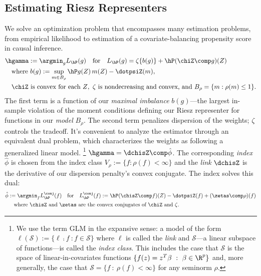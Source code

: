 \documentclass{article}
\newcommand{\calS}{\mathcal{S}}
\begin{document}
\subsection{Estimating Riesz Representers}
\label{sec:estimating-riesz}

We solve an optimization problem that encompasses many estimation problems, from empirical likelihood to estimation of a covariate-balancing propensity score in causal inference.
\begin{equation}
\label{eq:primal-moment-matching}
\begin{aligned}
&\hgamma := \argmin_{g} L_{\hP}(g) \qfor
L_{\hP}(g) =  \zeta\{b(g)\} + \hP (\chiZ \comp g)(Z) \\
&\quad \text{where} \ b(g) := \sup_{m \in B_\rho} \hP g(Z)\, m(Z) - \dotpsiZ(m), \\
&\quad \chiZ \ \text{is convex for each $Z$}, \ \zeta \ \text{is nondecreasing and convex, and} \ B_\rho = \{m : \rho(m) \le 1\}.
\end{aligned}
\end{equation}
The first term is a function of our \emph{maximal imbalance}
$b(g)$---the
largest in-sample violation of the moment conditions
defining our Riesz representer
for functions in our \emph{model} $B_\rho$.
The second term penalizes dispersion of the weights;
$\zeta$ controls the tradeoff.
It's convenient to analyze the estimator
through an equivalent dual problem,
which characterizes the weights
as following a generalized linear model.%
\footnote{We use the term GLM in the expansive sense:
a model of the form
$\ell(\calS) := \{ \ell \comp f \ : f \in \calS \}$
where $\ell$ is called the \emph{link}
and $\calS$---a linear subspace of functions---is
called the \emph{index class}.
This includes the case that $\calS$ is the space
of linear-in-covariates functions
$\{ f(z)=z^T \beta \ : \ \beta \in \R^p \}$
and, more generally, the case that
$\calS=\{ f \ : \ \rho(f) < \infty \}$
for any seminorm $\rho$.}
$\hgamma = \dchisZ \comp \hat\phi$.
The corresponding \emph{index} $\hat\phi$
is chosen from
the index class $V_\rho := \{f : \rho(f) < \infty\}$
and the \emph{link} $\dchisZ$
is the derivative
of our dispersion penalty's convex conjugate.
The index solves this dual:
\begin{equation}
\begin{aligned}
\label{eq:dual-problem}
\hat\phi &:= \argmin_{f} L^\conj_{\hP}(f) \qfor
L^\conj_{\hP}(f) := \hP (\chisZ \comp f)(Z) - \dotpsiZ(f) + (\zetas \comp \rho)(f) \\
&\quad \text{where} \ \chisZ \ \text{and} \ \zetas \ \text{are the convex conjugates of} \ \chiZ \ \text{and} \ \zeta.
\end{aligned}
\end{equation}
\end{document}
